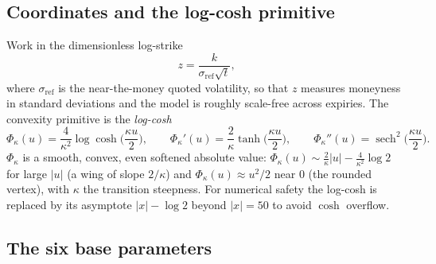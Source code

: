 \documentclass[11pt]{article}
\begin{document}
\subsection{Coordinates and the log-cosh primitive}

Work in the dimensionless log-strike
\begin{equation}
z=\frac{k}{\sigma_{\text{ref}}\sqrt t},
\label{eq:zdef}
\end{equation}
where $\sigma_{\text{ref}}$ is the near-the-money quoted volatility, so that $z$
measures moneyness in standard deviations and the model is roughly scale-free
across expiries. The convexity primitive is the \emph{log-cosh}
\begin{equation}
\Phi_\kappa(u)=\frac{4}{\kappa^2}\log\cosh\!\Big(\frac{\kappa u}{2}\Big),
\qquad
\Phi_\kappa'(u)=\frac{2}{\kappa}\tanh\!\Big(\frac{\kappa u}{2}\Big),
\qquad
\Phi_\kappa''(u)=\operatorname{sech}^2\!\Big(\frac{\kappa u}{2}\Big).
\label{eq:phi}
\end{equation}
$\Phi_\kappa$ is a smooth, convex, even softened absolute value:
$\Phi_\kappa(u)\sim\tfrac{2}{\kappa}|u|-\tfrac{4}{\kappa^2}\log2$ for large $|u|$
(a wing of slope $2/\kappa$) and $\Phi_\kappa(u)\approx u^2/2$ near $0$ (the
rounded vertex), with $\kappa$ the transition steepness. For numerical safety the
log-cosh is replaced by its asymptote $|x|-\log2$ beyond $|x|=50$ to avoid
$\cosh$ overflow.

\subsection{The six base parameters}
\end{document}
